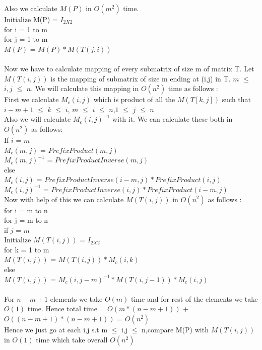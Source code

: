 \documentclass{article}
\begin{document}
Also we calculate $M(P)$ in $O(m^{2})$ time. \\ 
Initialize M(P) = $I_{2X2}$ \\
for i = 1 to m \\ 
\hspace*{1cm}for j = 1 to m \\  
\hspace*{2cm} $M(P)$ = $M(P) * M(T(j,i))$ \\\\
Now we have to calculate mapping of every submatrix of size m of matrix T. Let $M(T(i,j))$ is the mapping of submatrix of size m ending at (i,j) in T. $m$ $\leq$ $i,j$ $\leq$ $n$. We will calculate this mapping in $O(n^{2})$ time as follows : \\
First we calculate $M_c(i,j)$ which is product of all the $M(T[k,j])$
such that $i - m + 1$ $\leq$ $k$ $\leq$ $i$, $m$ $\leq$ $i$ $\leq$ $n$,$1$ $\leq$ $j$ $\leq$ $n$ \\
Also we will calculate $M_c(i,j)^{-1}$ with it. 
We can calculate these both in $O(n^{2})$ as follows:\\
If $i$ = $m$ \\
\hspace*{1cm} $M_c(m,j)$ = $PrefixProduct(m,j)$ \\
\hspace*{1cm} $M_c(m,j)^{-1}$ = $PrefixProductInverse(m,j)$ \\
else \\
\hspace*{1cm} $M_c(i,j)$ = $PrefixProductInverse(i-m,j)*PrefixProduct(i,j)$ \\
\hspace*{1cm} $M_c(i,j)^{-1}$ = $PrefixProductInverse(i,j)*PrefixProduct(i-m,j)$ \\ 
Now with help of this we can calculate $M(T(i,j))$ in $O(n^{2})$ as follows : \\
for i = m to n \\
\hspace*{1cm}	for j = m to n \\ 
\hspace*{2cm}if $j$ = $m$ \\
\hspace*{3cm}	Initialize $M(T(i,j))$ = $I_{2X2}$ \\ 
\hspace*{3cm}	for k = 1 to m  \\ 
\hspace*{4cm}		$M(T(i,j))$ = $M(T(i,j)) * M_c(i,k)$ \\
\hspace*{2cm}else \\
\hspace*{3cm} $M(T(i,j))$ = $M_c(i,j-m)^{-1}*M(T(i,j-1))*M_c(i,j)$\\\\
For $n-m+1$ elements we take $O(m)$ time and for rest of the elements we take $O(1)$ time. Hence total time = $O(m*(n-m+1))$ + $O((n-m+1)*(n-m+1))$ = $O(n^{2})$\\ 
Hence we just go at each i,j s.t m $\leq$ i,j $\leq$ n,compare M(P) with $M(T(i,j))$ in $O(1)$ time which take overall $O(n^2)$
\end{document}
